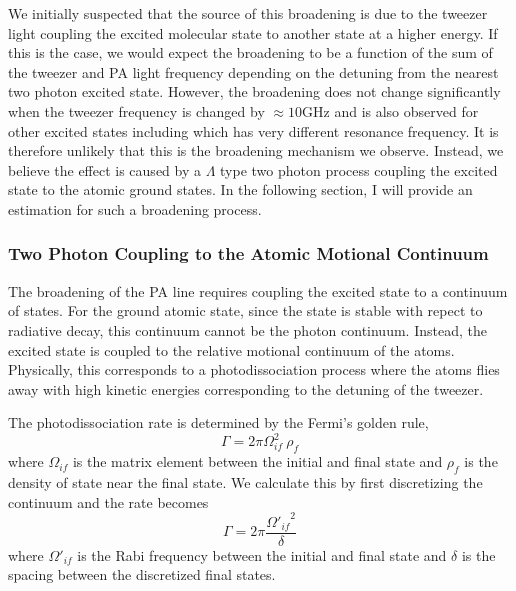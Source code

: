 We initially suspected that the source of this broadening is due to the tweezer light
coupling the excited molecular state to another state at a higher energy. 
If this is the case, we would expect the broadening to be a function of
the sum of the tweezer and PA light frequency depending on the detuning from the nearest
two photon excited state.
However, the broadening does not change significantly when the tweezer frequency
is changed by $\approx10\mathrm{GHz}$ and
is also observed for other excited states including 
which has very different resonance frequency.
It is therefore unlikely that this is the broadening mechanism we observe.
Instead, we believe the effect is caused by a $\Lambda$ type two photon process
coupling the excited state to the atomic ground states.
In the following section, I will provide an estimation for such a broadening process.


\subsubsection{Two Photon Coupling to the Atomic Motional Continuum}
The broadening of the PA line requires coupling the excited state to a continuum of states.
For the ground atomic state, since the state is stable with repect to radiative decay,
this continuum cannot be the photon continuum.
Instead, the excited state is coupled to the relative motional continuum of the atoms.
Physically, this corresponds to a photodissociation process
where the atoms flies away with high kinetic energies corresponding
to the detuning of the tweezer.

The photodissociation rate is determined by the Fermi's golden rule,
\[
  \Gamma=2\pi\Omega_{if}^2\ \rho_f
\]
where $\Omega_{if}$ is the matrix element between the initial and final state
and $\rho_f$ is the density of state near the final state.
We calculate this by first discretizing the continuum and the rate becomes
\[
  \Gamma=2\pi\frac{{\Omega'_{if}}^2}{\delta}
\]
where $\Omega'_{if}$ is the Rabi frequency between the initial and final state
and $\delta$ is the spacing between the discretized final states.


